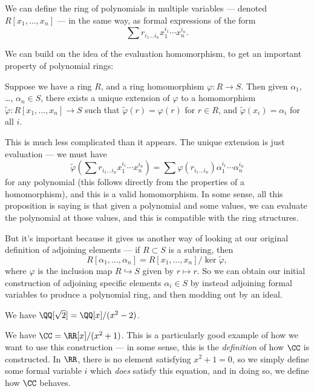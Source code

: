 We can define the ring of polynomials in multiple variables --- denoted $R[x_1, \ldots, x_n]$ --- in the same way, as formal expressions of the form \[\sum r_{i_1\ldots i_n}x_1^{i_1}\cdots x_n^{i_n}.\] 

We can build on the idea of the evaluation homomorphism, to get an important property of polynomial rings:

\begin{proposition}
    Suppose we have a ring $R$, and a ring homomorphism $\varphi : R \to S$. Then given $\alpha_1$, \ldots, $\alpha_n \in S$, there exists a unique extension of $\varphi$ to a homomorphism $\widetilde{\varphi} : R[x_1, \ldots, x_n] \to S$ such that $\widetilde{\varphi}(r) = \varphi(r)$ for $r \in R$, and $\widetilde{\varphi}(x_i) = \alpha_i$ for all $i$. 
\end{proposition}

This is much less complicated than it appears. The unique extension is just evaluation --- we must have \[\widetilde{\varphi}\left(\sum r_{i_1\ldots i_n}x_1^{i_1}\cdots x_n^{i_n}\right) = \sum \varphi(r_{i_1\ldots i_n})\alpha_1^{i_1}\cdots \alpha_n^{i_n}\] for any polynomial (this follows directly from the properties of a homomorphism), and this is a valid homomorphism. In some sense, all this proposition is saying is that given a polynomial and some values, we can evaluate the polynomial at those values, and this is compatible with the ring structures. 

But it's important because it gives us another way of looking at our original definition of adjoining elements --- if $R \subset S$ is a subring, then \[R[\alpha_1, \ldots, \alpha_n] = R[x_1, \ldots, x_n]/\ker \widetilde{\varphi},\] where $\varphi$ is the inclusion map $R \hookrightarrow S$ given by $r \mapsto r$. So we can obtain our initial construction of adjoining specific elements $\alpha_i \in S$ by instead adjoining formal variables to produce a polynomial ring, and then modding out by an ideal. 

\begin{example}
We have $\QQ[\sqrt{2}] = \QQ[x]/(x^2 - 2)$.
\end{example}

\begin{example}
We have $\CC = \RR[x]/(x^2 + 1)$. This is a particularly good example of how we want to use this construction --- in some sense, this is the \emph{definition} of how $\CC$ is constructed. In $\RR$, there is no element satisfying $x^2 + 1 = 0$, so we simply define some formal variable $i$ which \emph{does} satisfy this equation, and in doing so, we define how $\CC$ behaves.
\end{example}

